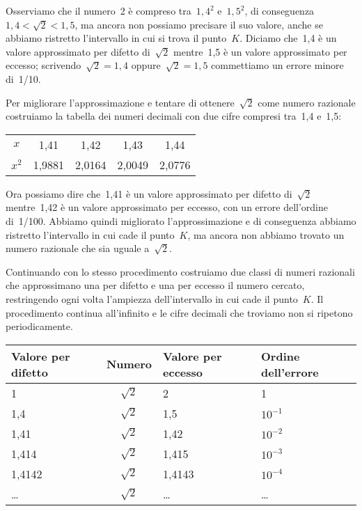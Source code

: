 Osserviamo che il numero~2 è compreso tra~$1,4^{2}$ e~$1,5^{2}$,
di conseguenza~$1,4<\sqrt{2}<1,5$, ma ancora
non possiamo precisare il suo valore, anche se abbiamo ristretto
l'intervallo in cui si trova il punto~$K$. Diciamo che~1,4 è un valore approssimato per
difetto di~$\sqrt{2}$ mentre~1,5
è un valore approssimato per eccesso; scrivendo~$\sqrt{2}=1,4$
oppure~$\sqrt{2}=1,5$ commettiamo un errore minore di~1/10.

Per migliorare l'approssimazione e tentare di ottenere~$\sqrt{2}$
come numero razionale costruiamo la tabella dei numeri
decimali con due cifre compresi tra~1,4 e~1,5:

\begin{center}
\begin{tabular}{ccccc}
\toprule
$x$ &1,41 &1,42 &1,43 &1,44\\
$x^{2}$ & 1,9881 & 2,0164 & 2,0049 & 2,0776\\
\bottomrule
\end{tabular}
\end{center}

Ora possiamo dire che~1,41 è un valore approssimato per difetto di~$\sqrt{2}$ mentre~1,42 è un valore approssimato
per eccesso, con un errore dell'ordine di~1/100. Abbiamo quindi migliorato
l'approssimazione e di conseguenza abbiamo ristretto l'intervallo in cui cade il punto~$K$, ma ancora non
abbiamo trovato un numero razionale che sia uguale a~$\sqrt{2}$.

Continuando con lo stesso procedimento costruiamo due classi di numeri razionali che approssimano una per difetto e
una per eccesso il numero cercato, restringendo ogni volta l'ampiezza dell'intervallo in cui cade il punto~$K$.
Il procedimento continua all'infinito e le cifre decimali che troviamo non si ripetono periodicamente.

\begin{center}
 \begin{tabular}{lcll}
\toprule
Valore per difetto & Numero &Valore per eccesso & Ordine dell'errore\\
\midrule
1	& $\sqrt{2}$ 	& 2 	&1\\
1,4	& $\sqrt{2}$	&1,5 	& $10^{-1}$\\
1,41	& $\sqrt{2}$	& 1,42	& $10^{-2}$\\
1,414	& $\sqrt{2}$	&1,415	&$10^{-3}$\\
1,4142	& $\sqrt{2}$	& 1,4143&$10^{-4}$\\
\ldots	& $\sqrt{2}$	&\ldots	&\ldots\\
\bottomrule
\end{tabular}
\end{center}

